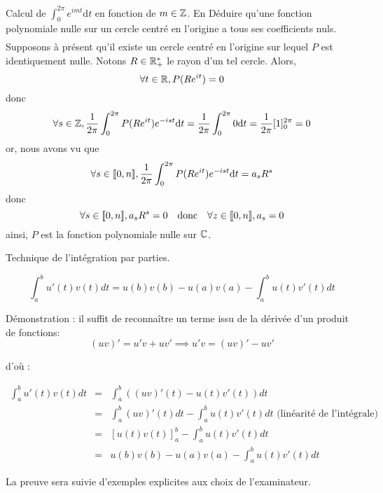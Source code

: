 \documentclass{article}
\begin{document}
\begin{question_kholle}{Calcul de $\displaystyle\int_0^{2\pi}e^{imt} \mathrm d t$ en fonction de $m \in \mathbb Z$. En Déduire qu'une fonction polynomiale nulle sur un cercle centré en l'origine a tous ses coefficients nuls.}
\begin{align*}
    \end{align*}
    Supposons à présent qu'il existe un cercle centré en l'origine sur lequel $P$ est identiquement nulle. Notons $R\in\mathbb R_+^*$ le rayon d'un tel cercle. Alors,
    \[
        \forall t\in\mathbb R, P(Re^{it})=0
    \]
    donc
    \[
        \forall s\in\mathbb Z, \frac{1}{2\pi}\int_0^{2\pi}P(Re^{it})e^{-ist}\mathrm d t = \frac{1}{2\pi}\int_0^{2\pi}0\mathrm d t=\frac{1}{2\pi}[1]_0^{2\pi}=0
    \]
    or, nous avons vu que
    \[
        \forall s\in[\![ 0,n ]\!], \frac{1}{2\pi}\int_0^{2\pi}P(Re^{it})e^{-ist}\mathrm d t = a_s R^s
    \]
    donc
    \[
        \forall s\in[\![ 0,n ]\!], a_sR^s = 0 \quad\text{donc}\quad \forall z\in[\![ 0,n ]\!], a_s = 0
    \]
    ainsi, $P$ est la fonction polynomiale nulle sur $\mathbb C$.
\end{question_kholle}


\pagebreak

\begin{question_kholle}{Technique de l'intégration par parties.}
\end{question_kholle}


$$
\int_{a}^{b} u'(t)v(t) dt= u(b)v(b) - u(a)v(a) - \int_{a}^{b} u(t)v'(t) dt
$$

Démonstration : il suffit de reconnaître un terme issu de la dérivée d'un produit de fonctions:
$$
(uv)' = u'v + uv' \implies u'v = (uv)' - uv'
$$

d'où :

\begin{eqnarray*}
	\int_{a}^{b} u'(t)v(t)dt &=& \int_{a}^{b} ((uv)'(t) - u(t)v'(t)) dt \\
	&=& \int_{a}^{b} (uv)'(t)dt - \int_{a}^{b}u(t)v'(t)dt  \text{ (linéarité de l'intégrale)} \\
	&=& \left[ u(t)v(t)\right]_{a}^{b} - \int_{a}^{b} u(t)v'(t)dt \\
	&=& u(b)v(b) - u(a)v(a) - \int_{a}^{b} u(t)v'(t)dt
\end{eqnarray*}

La preuve sera suivie d'exemples explicites aux choix de l'examinateur.
\end{document}
